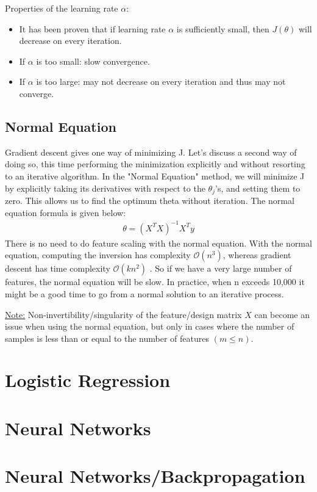 \documentclass{article}
\begin{document}
            Properties of the learning rate $\alpha$:
            \begin{itemize}
                \item It has been proven that if learning rate $\alpha$ is sufficiently small, then $J(\theta)$ will decrease on every iteration.
                \item If $\alpha$ is too small: slow convergence.
                \item If $\alpha$ is too large: may not decrease on every iteration and thus may not converge.
            \end{itemize}

        \subsection{Normal Equation}

        Gradient descent gives one way of minimizing J. Let’s discuss a second way of doing so, this time performing the minimization explicitly and
        without resorting to an iterative algorithm. In the "Normal Equation" method, we will minimize J by explicitly taking its derivatives with 
        respect to the $\theta_j$’s, and setting them to zero. This allows us to find the optimum theta without iteration. The normal equation formula is given below:
        \begin{align*}
            \theta = (X^TX)^{-1}X^Ty
        \end{align*}
        There is no need to do feature scaling with the normal equation. With the normal equation, computing the inversion has complexity 
        $\mathcal{O}(n^3)$, whereas gradient descent has time complexity $\mathcal{O}(kn^2)$ . So if we have a very large number of features, the normal equation will be slow. In practice, when n exceeds 
        10,000 it might be a good time to go from a normal solution to an iterative process.
        \par
        \underline{Note:} Non-invertibility/singularity of the feature/design matrix $X$ can become an issue when using the 
        normal equation, but only in cases where the number of samples is less than or equal to the number of features $(m \leq n)$. 
    
    \section{Logistic Regression}

    \section{Neural Networks}

    \section{Neural Networks/Backpropagation}
\end{document}
